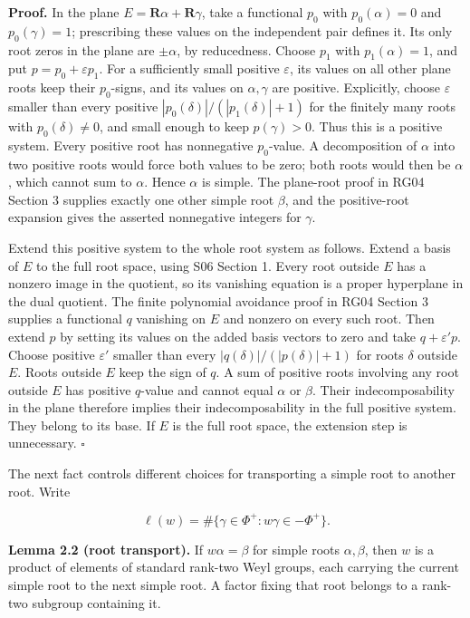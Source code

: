 \documentclass[11pt,a4paper,openany]{report}
\begin{document}
\textbf{Proof.} In the plane \(E=\mathbf R\alpha+\mathbf R\gamma\), take a functional \(p_0\) with \(p_0(\alpha)=0\) and \(p_0(\gamma)=1\); prescribing these values on the independent pair defines it. Its only root zeros in the plane are \(\pm\alpha\), by reducedness. Choose \(p_1\) with \(p_1(\alpha)=1\), and put \(p=p_0+\varepsilon p_1\). For a sufficiently small positive \(\varepsilon\), its values on all other plane roots keep their \(p_0\)-signs, and its values on \(\alpha,\gamma\) are positive. Explicitly, choose \(\varepsilon\) smaller than every positive \(|p_0(\delta)|/(|p_1(\delta)|+1)\) for the finitely many roots with \(p_0(\delta)\ne0\), and small enough to keep \(p(\gamma)>0\). Thus this is a positive system. Every positive root has nonnegative \(p_0\)-value. A decomposition of \(\alpha\) into two positive roots would force both values to be zero; both roots would then be \(\alpha\), which cannot sum to \(\alpha\). Hence \(\alpha\) is simple. The plane-root proof in RG04 Section 3 supplies exactly one other simple root \(\beta\), and the positive-root expansion gives the asserted nonnegative integers for \(\gamma\).

Extend this positive system to the whole root system as follows. Extend a basis of \(E\) to the full root space, using S06 Section 1. Every root outside \(E\) has a nonzero image in the quotient, so its vanishing equation is a proper hyperplane in the dual quotient. The finite polynomial avoidance proof in RG04 Section 3 supplies a functional \(q\) vanishing on \(E\) and nonzero on every such root. Then extend \(p\) by setting its values on the added basis vectors to zero and take \(q+\varepsilon' p\). Choose positive \(\varepsilon'\) smaller than every \(|q(\delta)|/(|p(\delta)|+1)\) for roots \(\delta\) outside \(E\). Roots outside \(E\) keep the sign of \(q\). A sum of positive roots involving any root outside \(E\) has positive \(q\)-value and cannot equal \(\alpha\) or \(\beta\). Their indecomposability in the plane therefore implies their indecomposability in the full positive system. They belong to its base. If \(E\) is the full root space, the extension step is unnecessary. \(\square\)

The next fact controls different choices for transporting a simple root to another root. Write

\[
\ell(w)=\#\{\gamma\in\Phi^+:w\gamma\in-\Phi^+\}.
\]

\textbf{Lemma 2.2 (root transport).} If \(w\alpha=\beta\) for simple roots \(\alpha,\beta\), then \(w\) is a product of elements of standard rank-two Weyl groups, each carrying the current simple root to the next simple root. A factor fixing that root belongs to a rank-two subgroup containing it.
\end{document}
